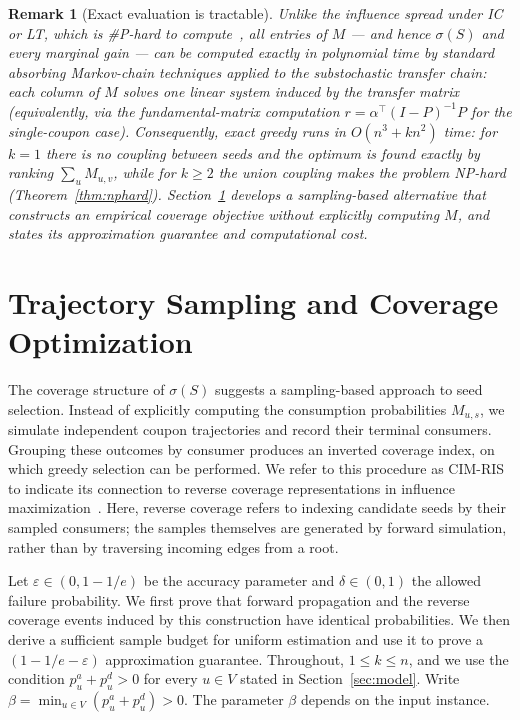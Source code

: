 \documentclass[sigconf]{acmart}
\newcommand{\CIMRIS}{\textsc{CIM-RIS}}
\newtheorem{remark}{Remark}[section]
\begin{document}
\begin{remark}[Exact evaluation is tractable]
\label{rem:tractable-eval}
Unlike the influence spread under IC or LT, which is
\#P-hard to compute~\cite{chen2010scalable}, all entries of $M$ ---
and hence $\sigma(S)$ and every marginal gain --- can be computed
\emph{exactly} in polynomial time by standard absorbing Markov-chain
techniques applied to the substochastic transfer chain: each column
of $M$ solves one linear system induced by the transfer matrix
(equivalently, via the fundamental-matrix computation
$r=\alpha^{\top}(I-P)^{-1}P$ for the single-coupon case).
Consequently, exact greedy runs in $O(n^3+kn^2)$ time: for $k=1$
there is no coupling between seeds and the optimum is found exactly
by ranking $\sum_{u}M_{u,v}$, while for $k\ge 2$ the union coupling
makes the problem NP-hard (Theorem~\ref{thm:nphard}).
Section~\ref{sec:algo} develops a sampling-based alternative that
constructs an empirical coverage objective without explicitly computing
$M$, and states its approximation guarantee and computational cost.
\end{remark}





\section{Trajectory Sampling and Coverage Optimization}
\label{sec:algo}

The coverage structure of $\sigma(S)$ suggests a sampling-based approach
to seed selection. Instead of explicitly computing the consumption
probabilities $M_{u,s}$, we simulate independent coupon trajectories and
record their terminal consumers. Grouping these outcomes by consumer
produces an inverted coverage index, on which greedy selection can be
performed. We refer to this procedure as \CIMRIS{} to indicate its
connection to reverse coverage representations in influence
maximization~\cite{borgs2014maximizing,tang2015influence}.
Here, reverse coverage refers to indexing candidate seeds by their
sampled consumers; the samples themselves are generated by forward
simulation, rather than by traversing incoming edges from a root.

Let $\varepsilon\in(0,1-1/e)$ be the accuracy parameter and
$\delta\in(0,1)$ the allowed failure probability.
We first prove that forward propagation and the reverse coverage
events induced by this construction have identical probabilities.
We then derive a sufficient sample budget for uniform estimation
and use it to prove a $(1-1/e-\varepsilon)$ approximation guarantee.
Throughout, $1\le k\le n$, and we use the condition
$p_u^a+p_u^d>0$ for every $u\in V$ stated in
Section~\ref{sec:model}. Write
$\beta=\min_{u\in V}(p_u^a+p_u^d)>0$.
The parameter $\beta$ depends on the input instance.
\end{document}

